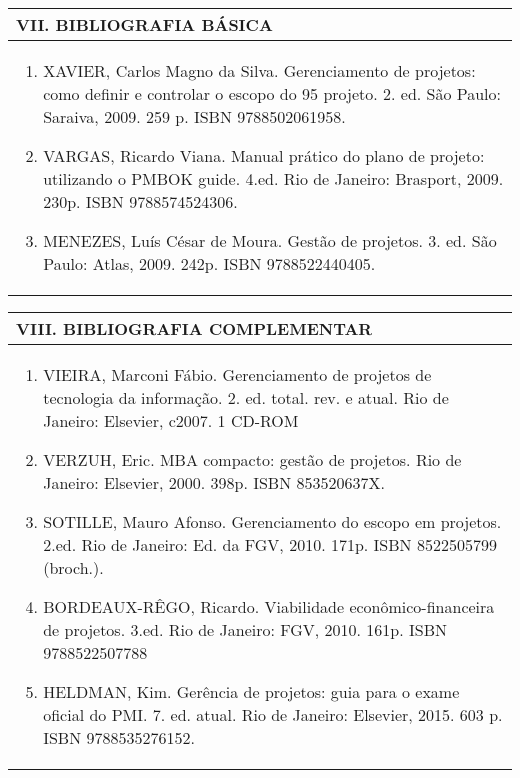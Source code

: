 \documentclass[12pt]{article}
\begin{document}
\begin{longtable}{|L{1.025\textwidth}|} \hline
%
{\bf VII. BIBLIOGRAFIA BÁSICA} \\ \hline

\begin{enumerate}
\item XAVIER, Carlos Magno da Silva. Gerenciamento de projetos: como definir e controlar o escopo do 95 projeto. 2. ed. São Paulo: Saraiva, 2009. 259 p. ISBN 9788502061958. 
\item VARGAS, Ricardo Viana. Manual prático do plano de projeto: utilizando o PMBOK guide. 4.ed. Rio de Janeiro: Brasport, 2009. 230p. ISBN 9788574524306. 
\item  MENEZES, Luís César de Moura. Gestão de projetos. 3. ed. São Paulo: Atlas, 2009. 242p. ISBN 9788522440405.
\end{enumerate}

 \\ \hline
\end{longtable}



\begin{longtable}{|L{1.025\textwidth}|} \hline
%
{\bf VIII. BIBLIOGRAFIA COMPLEMENTAR} \\ \hline
\begin{enumerate}
\item VIEIRA, Marconi Fábio. Gerenciamento de projetos de tecnologia da informação. 2. ed. total. rev. e atual. Rio de Janeiro: Elsevier, c2007. 1 CD-ROM 
\item VERZUH, Eric. MBA compacto: gestão de projetos. Rio de Janeiro: Elsevier, 2000. 398p. ISBN 853520637X. 
\item SOTILLE, Mauro Afonso. Gerenciamento do escopo em projetos. 2.ed. Rio de Janeiro: Ed. da FGV, 2010. 171p. ISBN 8522505799 (broch.).
\item BORDEAUX-RÊGO, Ricardo. Viabilidade econômico-financeira de projetos. 3.ed. Rio de Janeiro: FGV, 2010. 161p. ISBN 9788522507788
\item HELDMAN, Kim. Gerência de projetos: guia para o exame oficial do PMI. 7. ed. atual. Rio de Janeiro: Elsevier, 2015. 603 p. ISBN 9788535276152. 
%
\end{enumerate}
 \\ \hline
\end{longtable}



\end{document}
